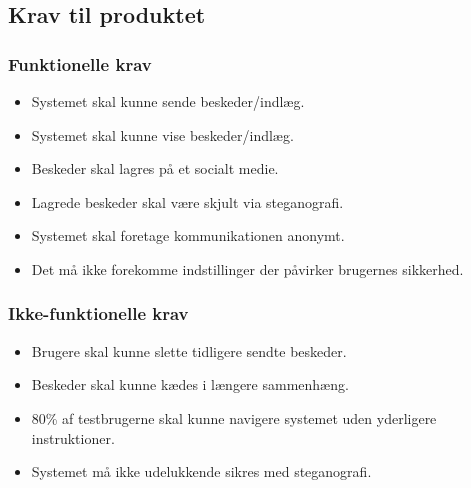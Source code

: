 \subsection{Krav til produktet}
\begin{itemize}
    \subsubsection{Funktionelle krav}
    \begin{itemize}
        \item Systemet skal kunne sende beskeder/indlæg.
        \item Systemet skal kunne vise beskeder/indlæg.
        \item Beskeder skal lagres på et socialt medie.
        \item Lagrede beskeder skal være skjult via steganografi.
        \item Systemet skal foretage kommunikationen anonymt.
        \item Det må ikke forekomme indstillinger der påvirker brugernes sikkerhed.
    \end{itemize}
    \subsubsection{Ikke-funktionelle krav}
    \begin{itemize}
        \item Brugere skal kunne slette tidligere sendte beskeder.
        \item Beskeder skal kunne kædes i længere sammenhæng.
        \item 80\% af testbrugerne skal kunne navigere systemet uden yderligere instruktioner.
        \item Systemet må ikke udelukkende sikres med steganografi.
    \end{itemize}  
\end{itemize}

